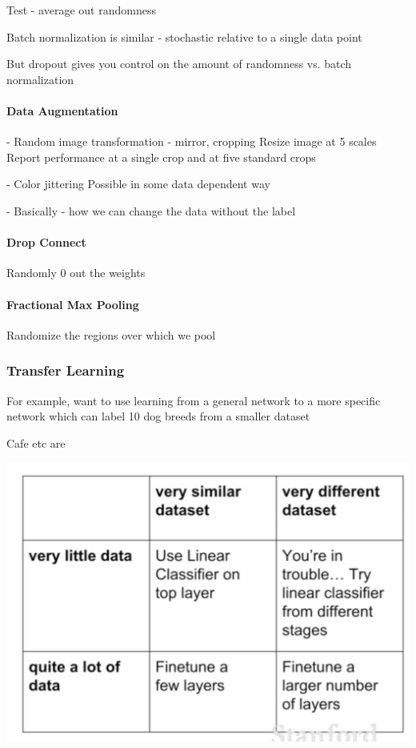Test - average out randomness

Batch normalization is similar - stochastic relative to a single data point

But dropout gives you control on the amount of randomness vs. batch normalization

\paragraph{Data Augmentation}

- Random image transformation - mirror, cropping
  Resize image at 5 scales
  Report performance at a single crop and at five standard crops

- Color jittering
  Possible in some data dependent way

- Basically - how we can change the data without the label

\paragraph{Drop Connect}

Randomly 0 out the weights

\paragraph{Fractional Max Pooling}

Randomize the regions over which we pool

\subsubsection{Transfer Learning}

For example, want to use learning from a general network to a more specific network which can label 10 dog breeds from a smaller dataset

Cafe etc are 

\includegraphics[width=0.5\columnwidth]{fei_fei_li/lecture_07/guidelines_transfer_learning.png}

